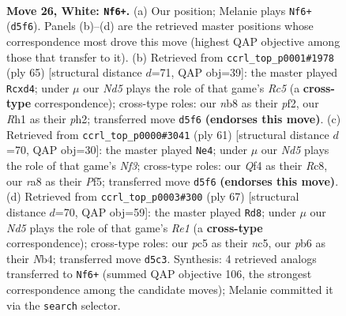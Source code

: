\documentclass[11pt]{article}
\begin{document}
\clearpage

\begin{figure}[p]\centering
\begin{subfigure}{0.46\textwidth}\centering
\resizebox{\linewidth}{!}{%
\newchessgame
\chessboard[
  setfen={rn1qk2r/8/1p1p4/pPpN2p1/4PQ2/7P/RP4P1/2K4R w q - 0 26},
  showmover=false,
  pgfstyle=straightmove, color=movearrow, markmove={d5-f6}
]}
\caption{}
\end{subfigure}\hfill
\begin{subfigure}{0.46\textwidth}\centering
\resizebox{\linewidth}{!}{%
\newchessgame
\chessboard[
  setfen={3r2k1/p5pp/1p2R3/5p2/q1rP1P2/6P1/P4P1P/Q2R2K1 b - - 8 33},
  showmover=false,
  pgfstyle=straightmove, color=movearrow, markmove={c4-d4}
]}
\caption{}
\end{subfigure}
\\[4pt]
\begin{subfigure}{0.46\textwidth}\centering
\resizebox{\linewidth}{!}{%
\newchessgame
\chessboard[
  setfen={2r3k1/pp3pp1/2P2n2/qP3p1p/P7/BQ5P/6P1/2R3K1 b - - 0 31},
  showmover=false,
  pgfstyle=straightmove, color=movearrow, markmove={f6-e4}
]}
\caption{}
\end{subfigure}\hfill
\begin{subfigure}{0.46\textwidth}\centering
\resizebox{\linewidth}{!}{%
\newchessgame
\chessboard[
  setfen={4r2k/r6p/2p2qp1/p1N5/1n1PPP2/2Q3P1/7P/R4BK1 b - - 12 34},
  showmover=false,
  pgfstyle=straightmove, color=movearrow, markmove={e8-d8}
]}
\caption{}
\end{subfigure}
\caption{\textbf{Move 26, White: \texttt{Nf6+}.} (a) Our position; Melanie plays \texttt{Nf6+} (\texttt{d5f6}). Panels (b)--(d) are the retrieved master positions whose correspondence most drove this move (highest QAP objective among those that transfer to it). (b) Retrieved from \texttt{ccrl\_top\_p0001\#1978} (ply 65) [structural distance $d$=71, QAP obj=39]: the master played \texttt{Rcxd4}; under $\mu$ our \emph{Nd5} plays the role of that game's \emph{Rc5} (a \textbf{cross-type} correspondence); cross-type roles: our \emph{n}b8 as their \emph{p}f2, our \emph{R}h1 as their \emph{p}h2; transferred move \texttt{d5f6} \textbf{(endorses this move)}. (c) Retrieved from \texttt{ccrl\_top\_p0000\#3041} (ply 61) [structural distance $d$=70, QAP obj=30]: the master played \texttt{Ne4}; under $\mu$ our \emph{Nd5} plays the role of that game's \emph{Nf3}; cross-type roles: our \emph{Q}f4 as their \emph{R}c8, our \emph{r}a8 as their \emph{P}f5; transferred move \texttt{d5f6} \textbf{(endorses this move)}. (d) Retrieved from \texttt{ccrl\_top\_p0003\#300} (ply 67) [structural distance $d$=70, QAP obj=59]: the master played \texttt{Rd8}; under $\mu$ our \emph{Nd5} plays the role of that game's \emph{Re1} (a \textbf{cross-type} correspondence); cross-type roles: our \emph{p}c5 as their \emph{n}c5, our \emph{p}b6 as their \emph{N}b4; transferred move \texttt{d5c3}. Synthesis: 4 retrieved analogs transferred to \texttt{Nf6+} (summed QAP objective 106, the strongest correspondence among the candidate moves); Melanie committed it via the \texttt{search} selector.}
\label{fig:thought-m50}
\end{figure}
\end{document}

